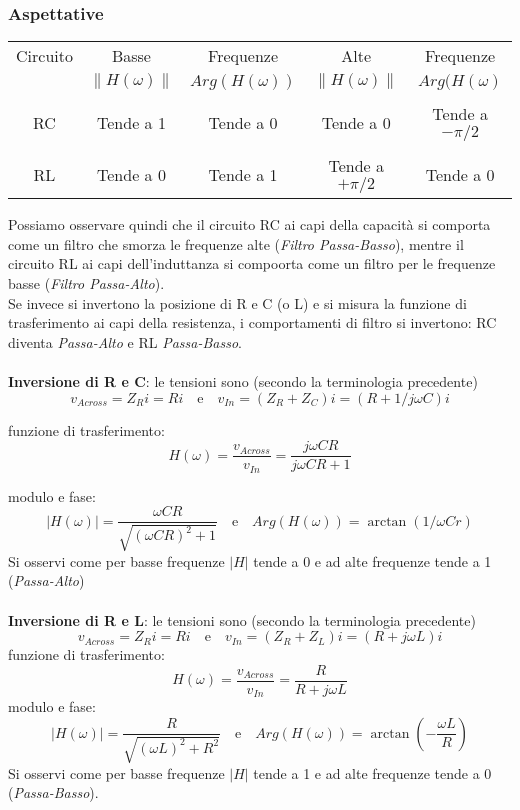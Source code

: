 \subsubsection{Aspettative}
\begin{center}
    \begin{tabular}{ |c|c c|c c|}
        \hline
        Circuito& Basse &Frequenze & Alte &Frequenze \\ 
                & $\| H(\omega) \| $ & $Arg(H(\omega))$ & $\|H(\omega)\|$ & $Arg(H(\omega)$ \\\hline
                &           &            &          &  \\
        RC      & Tende a 1 & Tende a 0  & Tende a 0& Tende a $-\pi/2$\\
                &           &            &          &   \\
        RL      & Tende a 0 & Tende a 1  & Tende a $+\pi/2$ & Tende a 0  \\ \hline
    \end{tabular}
    \label{tab:C3_P1_aspettative_RC_RL}
\end{center}
Possiamo osservare quindi che il circuito RC ai capi della capacità si comporta come un filtro che smorza le frequenze alte (\textit{Filtro Passa-Basso}), mentre il circuito RL ai capi dell'induttanza si compoorta come un filtro per le frequenze basse (\textit{Filtro Passa-Alto}).\\

Se invece si invertono la posizione di R e C (o L) e si misura la funzione di trasferimento ai capi della resistenza, i comportamenti di filtro si invertono: RC diventa \textit{Passa-Alto} e RL \textit{Passa-Basso}.\\\\
%
\textbf{Inversione di R e C}: le tensioni sono (secondo la terminologia precedente)
    $$v_{Across} = Z_Ri = Ri\quad\mathrm{e}\quad v_{In} = (Z_R+Z_C)i = (R + 1/j \omega C )i $$
    
funzione di trasferimento:
    $$H(\omega) = \frac{v_{Across} }{v_{In} } = \frac{j\omega CR}{j\omega CR + 1}$$
    
modulo e fase:
    $$ |H(\omega)| = \frac{\omega CR}{\sqrt{(\omega CR)^2 + 1}} \quad\mathrm{e}\quad Arg(H(\omega)) = \arctan (1/\omega Cr) $$
%
Si osservi come per basse frequenze $|H|$ tende a 0 e ad alte frequenze tende a 1 (\textit{Passa-Alto})\\\\
%
%
\textbf{Inversione di R e L}: le tensioni sono (secondo la terminologia precedente) 
    $$v_{Across} = Z_Ri = Ri\quad\mathrm{e}\quad v_{In} = (Z_R+Z_L)i = (R + j \omega L )i $$
funzione di trasferimento:
    $$H(\omega) = \frac{v_{Across} }{v_{In} } = \frac{R}{R + j\omega L}$$
modulo e fase:
    $$ |H(\omega)| = \frac{R}{\sqrt{(\omega L)^2 + R^2}} \quad\mathrm{e}\quad Arg(H(\omega)) = \arctan \left(-\frac{\omega L}{R} \right) $$
%  
Si osservi come per basse frequenze $|H|$ tende a 1 e ad alte frequenze tende a 0 (\textit{Passa-Basso}).\\

